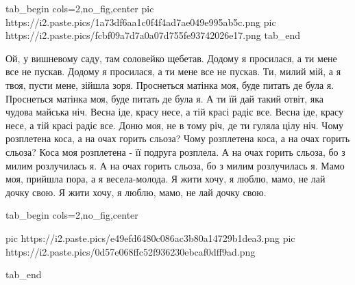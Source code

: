 \ifcmt
  tab_begin cols=2,no_fig,center
     pic https://i2.paste.pics/1a73df6aa1c0f4f4ad7ae049e995ab5c.png
     pic https://i2.paste.pics/fcbf09a7d7a0a07d755fe93742026e17.png
  tab_end
\fi

\raggedcolumns
\begin{multicols}{2} %
\setlength{\parindent}{0pt}
\obeycr
Ой, у вишневому саду, там соловейко щебетав.
Додому я просилася, а ти мене все не пускав.
Додому я просилася, а ти мене все не пускав.
\smallskip
Ти, милий мій, а я твоя, пусти мене, зійшла зоря.
Проснеться матінка моя, буде питать де була я.
Проснеться матінка моя, буде питать де була я.
\smallskip
А ти їй дай такий отвіт, яка чудова майська ніч.
Весна іде, красу несе, а тій красі радіє все.
Весна іде, красу несе, а тій красі радіє все.
\smallskip
Доню моя, не в тому річ, де ти гуляла цілу ніч.
Чому розплетена коса, а на очах горить сльоза?
Чому розплетена коса, а на очах горить сльоза?
\smallskip
Коса моя розплетена - її подруга розплела.
А на очах горить сльоза, бо з милим розлучилась я.
А на очах горить сльоза, бо з милим розлучилась я.
\smallskip
Мамо моя, прийшла пора, а я весела-молода.
Я жити хочу, я люблю, мамо, не лай дочку свою.
Я жити хочу, я люблю, мамо, не лай дочку свою.
\restorecr
\end{multicols} %

\ifcmt
  tab_begin cols=2,no_fig,center

     pic https://i2.paste.pics/e49efd6480c086ac3b80a14729b1dea3.png
     pic https://i2.paste.pics/0d57e068ffc52f936230ebcaf0dff9ad.png

  tab_end
\fi

